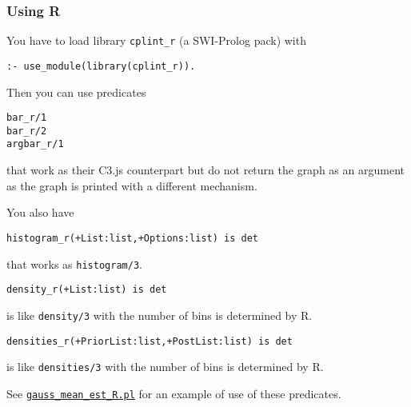 \subsubsection{Using R}
You have to load library \texttt{cplint\_r}  (a SWI-Prolog pack) with
\begin{verbatim}
:- use_module(library(cplint_r)).
\end{verbatim}
Then you can use predicates
\begin{verbatim}
bar_r/1
bar_r/2
argbar_r/1
\end{verbatim}
that work as their C3.js counterpart but do not return the graph as an argument as the graph is
printed with a different mechanism.

You also have
\begin{verbatim}
histogram_r(+List:list,+Options:list) is det
\end{verbatim}
that works as \texttt{histogram/3}.
\begin{verbatim}
density_r(+List:list) is det
\end{verbatim}
is like \texttt{density/3} with the number of bins  is determined
by R.
\begin{verbatim}
densities_r(+PriorList:list,+PostList:list) is det
\end{verbatim}
is like \texttt{densities/3} with the number of bins  is determined
by R.

See \href{http://cplint.eu/example/inference/gauss_mean_est_R.pl}{\texttt{gauss\_mean\_est\_R.pl}} for an example of use of these predicates.


